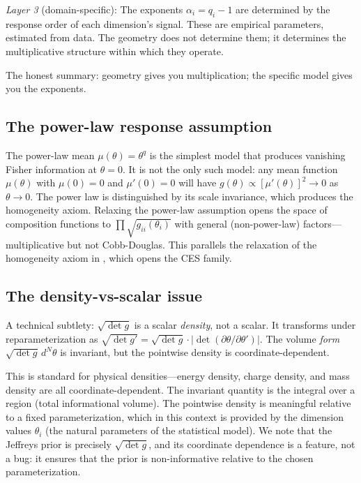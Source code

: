 \documentclass[12pt, a4paper]{article}
\theoremstyle{definition}
\theoremstyle{remark}
\begin{document}
\textit{Layer 3} (domain-specific): The exponents $\alpha_i = q_i - 1$ are determined by the response order of each dimension's signal. These are empirical parameters, estimated from data. The geometry does not determine them; it determines the multiplicative structure within which they operate.

The honest summary: geometry gives you multiplication; the specific model gives you the exponents.

\subsection{The power-law response assumption}

The power-law mean $\mu(\theta) = \theta^q$ is the simplest model that produces vanishing Fisher information at $\theta = 0$. It is not the only such model: any mean function $\mu(\theta)$ with $\mu(0) = 0$ and $\mu'(0) = 0$ will have $g(\theta) \propto [\mu'(\theta)]^2 \to 0$ as $\theta \to 0$. The power law is distinguished by its scale invariance, which produces the homogeneity axiom. Relaxing the power-law assumption opens the space of composition functions to $\prod \sqrt{g_{ii}(\theta_i)}$ with general (non-power-law) factors---multiplicative but not Cobb-Douglas. This parallels the relaxation of the homogeneity axiom in \cite{kirsch2026mc}, which opens the CES family.

\subsection{The density-vs-scalar issue}

A technical subtlety: $\sqrt{\det g}$ is a scalar \textit{density}, not a scalar. It transforms under reparameterization as $\sqrt{\det g'} = \sqrt{\det g} \cdot |\det(\partial \theta / \partial \theta')|$. The volume \textit{form} $\sqrt{\det g} \, d^N\!\theta$ is invariant, but the pointwise density is coordinate-dependent.

This is standard for physical densities---energy density, charge density, and mass density are all coordinate-dependent. The invariant quantity is the integral over a region (total informational volume). The pointwise density is meaningful relative to a fixed parameterization, which in this context is provided by the dimension values $\theta_i$ (the natural parameters of the statistical model). We note that the Jeffreys prior \cite{jeffreys1946} is precisely $\sqrt{\det g}$, and its coordinate dependence is a feature, not a bug: it ensures that the prior is non-informative relative to the chosen parameterization.
\end{document}
